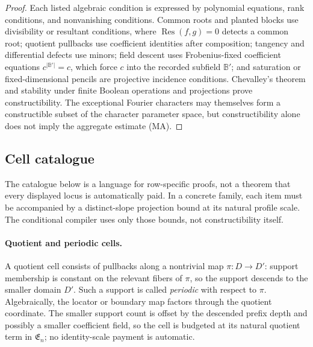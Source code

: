 \documentclass[12pt,a4paper]{amsart}
\numberwithin{equation}{section}
\theoremstyle{remark}
\newcommand{\B}{\mathbb B}
\newcommand{\abs}[1]{\lvert #1\rvert}
\begin{document}
\begin{proof}
Each listed algebraic condition is expressed by polynomial equations, rank
conditions, and nonvanishing conditions.  Common roots and planted blocks
use divisibility or resultant conditions, where
\(\operatorname{Res}(f,g)=0\) detects a common root; quotient pullbacks use
coefficient identities after composition; tangency and differential
defects use minors; field descent uses Frobenius-fixed coefficient equations
\(c^{\abs{\B'}}=c\), which force \(c\) into the recorded subfield
\(\B'\);
and saturation or fixed-dimensional pencils are projective incidence
conditions.  Chevalley's theorem and stability under finite Boolean
operations and projections prove constructibility.  The exceptional
Fourier characters may themselves form a constructible subset of the
character parameter space, but constructibility alone does not imply the
aggregate estimate \textup{(MA)}.
\end{proof}

\subsection{Cell catalogue}\label{sec:cell-catalogue}

The catalogue below is a language for row-specific proofs, not a theorem
that every displayed locus is automatically paid.  In a concrete family,
each item must be accompanied by a distinct-slope projection bound at its
natural profile scale.  The conditional compiler uses only those bounds,
not constructibility itself.

\paragraph{Quotient and periodic cells.}
A quotient cell consists of pullbacks along a nontrivial map
\(\pi:D\to D'\): support membership is constant on the relevant fibers
of \(\pi\), so the support descends to the smaller domain \(D'\).  Such a
support is called \emph{periodic} with respect to \(\pi\).  Algebraically,
the locator or boundary map factors
through the quotient coordinate.  The smaller support count is offset by
the descended prefix depth and possibly a smaller coefficient field, so
the cell is budgeted at its natural quotient term in \(\mathfrak E_n\);
no identity-scale payment is automatic.
\end{document}
